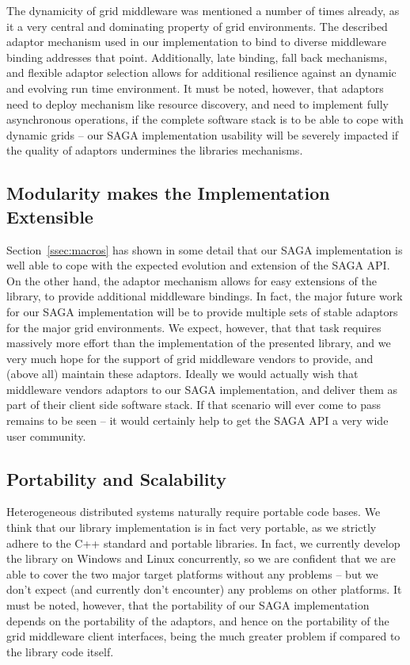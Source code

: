 The dynamicity of grid middleware was mentioned a number of times
 already, as it  a very central and dominating property of grid
 environments.  The described adaptor mechanism used in our
 implementation to bind to diverse middleware binding addresses that
 point.  Additionally, late binding, fall back mechanisms, and
 flexible adaptor selection allows for additional resilience against
 an dynamic and evolving run time environment.  It must be noted,
 however, that adaptors need to deploy mechanism like resource
 discovery, and need to implement fully asynchronous operations, if
 the complete software stack is to be able to cope with dynamic grids
 -- our SAGA implementation usability will be severely impacted if the
 quality of adaptors undermines the libraries mechanisms.


\subsection{Modularity makes the Implementation \\Extensible}

 Section~\ref{ssec:macros} has shown in some detail that our SAGA
 implementation is well able to cope with the expected evolution and
 extension of the SAGA API.  On the other hand, the adaptor mechanism
 allows for easy extensions of the library, to provide additional
 middleware bindings.  In fact, the major future work for our SAGA
 implementation will be to provide multiple sets of stable adaptors
 for the major grid environments.  We expect, however, that that task
 requires massively more effort than the implementation of the
 presented library, and we very much hope for the support of grid
 middleware vendors to provide, and (above all) maintain these
 adaptors.  Ideally we would actually wish that middleware vendors
  adaptors to our SAGA implementation, and deliver them
 as part of their client side software stack.  If that scenario will
 ever come to pass remains to be seen -- it would certainly help to
 get the SAGA API a very wide user community.


\subsection{Portability and Scalability}

 Heterogeneous distributed systems naturally require por\-table code
 bases.  We think that our library implementation is in fact very
 portable, as we strictly adhere to the C++ standard and portable 
 libraries.  In fact,
 we currently develop the library on Windows and Linux concurrently,
 so we are confident that we are able to cover the two
 major target platforms without any problems -- but we don't expect
 (and currently don't encounter) any problems on other platforms.  It
 must be noted, however, that the portability of our SAGA implementation
 depends on the portability of the adaptors, and hence on the portability 
 of the grid middleware client interfaces, being the much greater problem 
 if compared to the library code itself.

